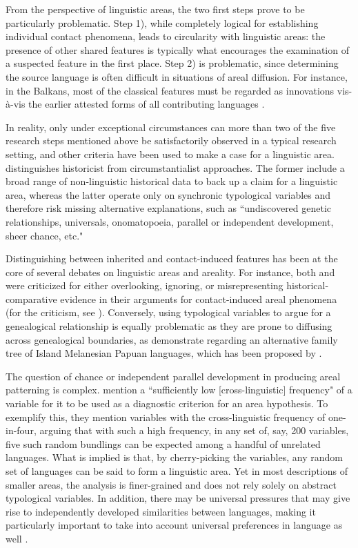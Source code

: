\documentclass[output=paper]{langscibook}
\begin{document}
From the perspective of linguistic areas, the two first steps prove to be particularly problematic. Step 1), while completely logical for establishing individual contact phenomena, leads to circularity with linguistic areas: the presence of other shared features is typically what encourages the examination of a suspected feature in the first place. Step 2) is problematic, since determining the source language is often difficult in situations of areal diffusion. For instance, in the Balkans, most of the classical features must be regarded as innovations vis-à-vis the earlier attested forms of all contributing languages \parencite{lindstedt2018}.

In reality, only under exceptional circumstances can more than two of the five research steps mentioned above be satisfactorily observed in a typical research setting, and other criteria have been used to make a case for a linguistic area. \textcite[31--36]{campbell1985} distinguishes historicist from circumstantialist approaches. The former include a broad range of non-linguistic historical data to back up a claim for a linguistic area, whereas the latter operate only on synchronic typological variables and therefore risk missing alternative explanations, such as ``undiscovered genetic relationships, universals, onomatopoeia, parallel or independent development, sheer chance, etc."

Distinguishing between inherited and contact-induced features has been at the core of several debates on linguistic areas and areality. For instance, both \citet{sherzer76} and \citet{dixon2002} were criticized for either overlooking, ignoring, or misrepresenting historical-comparative evidence in their arguments for contact-induced areal phenomena (for the criticism, see \citealt{campbell1985,evans2005}). Conversely, using typological variables to argue for a genealogical relationship is equally problematic as they are prone to diffusing across genealogical boundaries, as  \citet{donohueetal2008} demonstrate regarding an alternative family tree of Island Melanesian Papuan languages, which has been proposed by  \citet{dunnetal2007}.

The question of chance or independent parallel development in producing areal patterning is complex. \citet{Bickeletal2006Oceania} mention a ``sufficiently low [cross-linguistic] frequency" of a variable for it to be used as a diagnostic criterion for an area hypothesis. To exemplify this, they mention variables with the cross-linguistic frequency of one-in-four, arguing that with such a high frequency, in any set of, say, 200 variables, five such random bundlings can be expected among a handful of unrelated languages. What is implied is that, by cherry-picking the variables, any random set of languages can be said to form a linguistic area. Yet in most descriptions of smaller areas, the analysis is finer-grained and does not rely solely on abstract typological variables. In addition, there may be universal pressures that may give rise to independently developed similarities between languages, making it particularly important to take into account universal preferences in language as well \parencite{bickel2017universals}.
\end{document}
